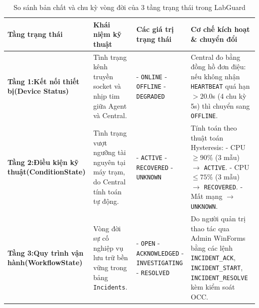 \documentclass[12pt,a4paper]{article}
\begin{document}
\begin{table}[H]
  \centering
  \caption{So sánh bản chất và chu kỳ vòng đời của 3 tầng trạng thái trong LabGuard}
  \label{tab:ba-tang-trang-thai}
  \small
  \begin{tabularx}{\textwidth}{|p{}|X|p{}|X|}
    \hline
    \rowcolor{lgDeepBlue}
    \color{white}\textbf{Tầng trạng thái} & \color{white}\textbf{Khái niệm kỹ thuật} & \color{white}\textbf{Các giá trị trạng thái} & \color{white}\textbf{Cơ chế kích hoạt \& chuyển đổi} \\
    \hline
    \textbf{Tầng 1:\newline Kết nối thiết bị\newline(Device Status)} &
    Tình trạng kênh truyền socket và nhịp tim giữa Agent và Central. &
    - \texttt{ONLINE}\newline
    - \texttt{OFFLINE}\newline
    - \texttt{DEGRADED} &
    Central đo bằng đồng hồ đơn điệu: nếu không nhận \texttt{HEARTBEAT} quá hạn $> 20.0$s (4 chu kỳ 5s) thì chuyển sang \texttt{OFFLINE}. \\
    \hline
    \textbf{Tầng 2:\newline Điều kiện kỹ thuật\newline(ConditionState)} &
    Tình trạng vượt ngưỡng tài nguyên tại máy trạm, do Central tính toán tự động. &
    - \texttt{ACTIVE}\newline
    - \texttt{RECOVERED}\newline
    - \texttt{UNKNOWN} &
    Tính toán theo thuật toán Hysteresis:\newline
    - CPU $\ge 90\%$ (3 mẫu) $\rightarrow$ \texttt{ACTIVE}.\newline
    - CPU $\le 75\%$ (3 mẫu) $\rightarrow$ \texttt{RECOVERED}.\newline
    - Mất mạng $\rightarrow$ \texttt{UNKNOWN}. \\
    \hline
    \textbf{Tầng 3:\newline Quy trình vận hành\newline(WorkflowState)} &
    Vòng đời sự cố nghiệp vụ lưu trữ bền vững trong bảng \texttt{Incidents}. &
    - \texttt{OPEN}\newline
    - \texttt{ACKNOWLEDGED}\newline
    - \texttt{INVESTIGATING}\newline
    - \texttt{RESOLVED} &
    Do người quản trị thao tác qua Admin WinForms bằng các lệnh \texttt{INCIDENT\_ACK}, \texttt{INCIDENT\_START}, \texttt{INCIDENT\_RESOLVE} kèm kiểm soát OCC. \\
    \hline
  \end{tabularx}
\end{table}
\end{document}
